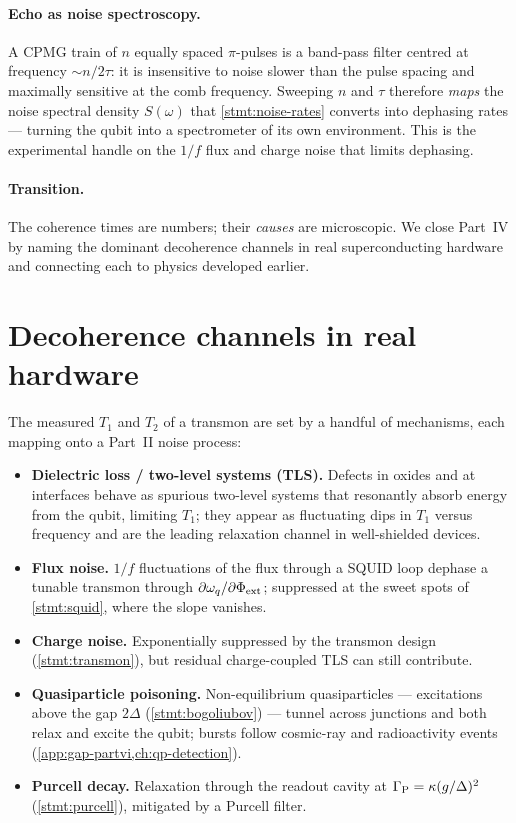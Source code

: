 \paragraph{Echo as noise spectroscopy.}
A CPMG train of $n$ equally spaced $\pi$-pulses is a band-pass filter
centred at frequency $\sim n/2\tau$: it is insensitive to noise slower
than the pulse spacing and maximally sensitive at the comb frequency.
Sweeping $n$ and $\tau$ therefore \emph{maps} the noise spectral density
$S(\omega)$ that \cref{stmt:noise-rates} converts into dephasing rates
--- turning the qubit into a spectrometer of its own environment. This
is the experimental handle on the $1/f$ flux and charge noise that
limits dephasing.

\paragraph{Transition.}
The coherence times are numbers; their \emph{causes} are microscopic.
We close Part~IV by naming the dominant decoherence channels in real
superconducting hardware and connecting each to physics developed
earlier.

\section{Decoherence channels in real hardware}
\label{sec:hardware-decoherence}

\begin{statement}
\label{stmt:hardware-decoherence}
The measured $T_1$ and $T_2$ of a transmon are set by a handful of
mechanisms, each mapping onto a Part~II noise process:
\begin{itemize}
\item \textbf{Dielectric loss / two-level systems (TLS).} Defects in
  oxides and at interfaces behave as spurious two-level systems that
  resonantly absorb energy from the qubit, limiting $T_1$; they appear
  as fluctuating dips in $T_1$ versus frequency and are the leading
  relaxation channel in well-shielded devices.
\item \textbf{Flux noise.} $1/f$ fluctuations of the flux through a
  SQUID loop dephase a tunable transmon through
  $\partial\omega_q/\partial\Phi_{\rm ext}$; suppressed at the sweet
  spots of \cref{stmt:squid}, where the slope vanishes.
\item \textbf{Charge noise.} Exponentially suppressed by the transmon
  design (\cref{stmt:transmon}), but residual charge-coupled TLS can
  still contribute.
\item \textbf{Quasiparticle poisoning.} Non-equilibrium quasiparticles
  --- excitations above the gap $2\Delta$ (\cref{stmt:bogoliubov}) ---
  tunnel across junctions and both relax and excite the qubit; bursts
  follow cosmic-ray and radioactivity events
  (\cref{app:gap-partvi,ch:qp-detection}).
\item \textbf{Purcell decay.} Relaxation through the readout cavity at
  $\Gamma_{\rm P}=\kappa(g/\Delta)^2$ (\cref{stmt:purcell}), mitigated
  by a Purcell filter.
\end{itemize}
\end{statement}


